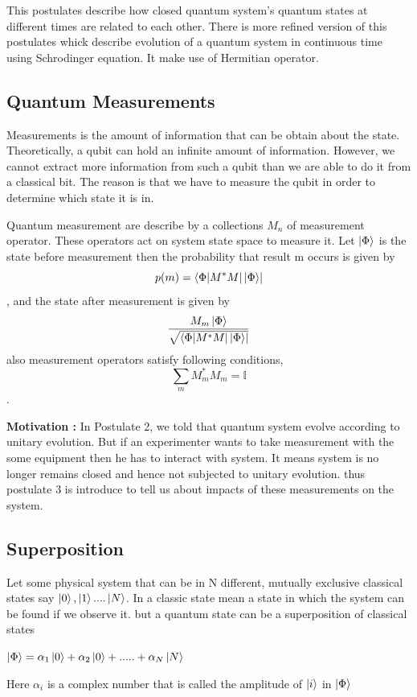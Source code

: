\documentclass[11 pt]{article}
\theoremstyle{definition}
\theoremstyle{remark}
\begin{document}
This postulates describe how closed quantum system's quantum states at different times are related to each other. There is more refined version of this postulates whick describe evolution of a quantum system in continuous time using Schrodinger equation. It make use of Hermitian operator.

\subsection{Quantum Measurements}
Measurements is the amount of information that can be obtain about the state. Theoretically, a qubit can hold an infinite amount of information. However, we cannot extract more information from such a
qubit than we are able to do it from a classical bit. The reason is that we have to measure the qubit in order to determine which state it is in.

Quantum measurement are describe by a collections ${M_n}$ of measurement operator. These operators act on system state space to measure it. Let $\ket{\Phi}$ is the state before measurement then the probability that result m occurs is given by 
$$p(m) = \bra{\Phi|M^{*}M|\ket{\Phi}}$$,
and the state after measurement is given by 
$$ \dfrac{M_m \ket{\Phi}}{\sqrt{\bra{\Phi|M^{*}M|\ket{\Phi}}}}$$
also measurement operators satisfy following conditions,
$$\sum_{m}M_{m}^{*}M_{m} = \mathbb{I}$$.

\textbf{Motivation :} In Postulate 2, we told that quantum system evolve according to unitary evolution. But if an experimenter wants to take measurement with the some equipment then he has to interact with system. It means system is no longer remains closed and hence not subjected to unitary evolution. thus postulate 3 is introduce to tell us about impacts of these measurements on the system.

\subsection{Superposition}
Let some physical system that can be in N different, mutually exclusive classical states say $\ket{0},\ket{1} .... \ket{N}$. In a classic state mean a state in which the system
can be found if we observe it. but a quantum state can be a superposition
of classical states
\begin{center}
$\ket{\Phi} = \alpha_1\ket{0} + \alpha_2\ket{0}+ ..... +\alpha_N\ket{N} $
\end{center}
Here $\alpha_i$ is a complex number that is called the amplitude of $\ket{i}$ in $\ket{\Phi}$
\end{document}

